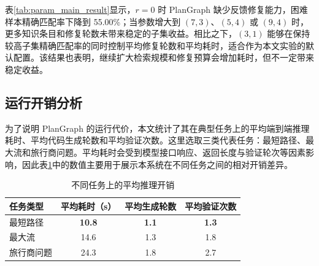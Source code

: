 \begin{table}[htbp]
\centering
\caption{不同参数组合下典型组合优化子集的性能比较（\%）}
\label{tab:param_main_result}
\small
{}
\end{table}

表\ref{tab:param_main_result}显示，$r=0$ 时 PlanGraph 缺少反馈修复能力，困难样本精确匹配率下降到 55.00\%；当参数增大到 $(7,3)$、$(5,4)$ 或 $(9,4)$ 时，更多知识条目和修复轮数未带来稳定的子集收益。相比之下，$(3,1)$ 能够在保持较高子集精确匹配率的同时控制平均修复轮数和平均耗时，适合作为本文实验的默认配置。该结果也表明，继续扩大检索规模和修复预算会增加耗时，但不一定带来稳定收益。

\subsection{运行开销分析}

为了说明 PlanGraph 的运行代价，本文统计了其在典型任务上的平均端到端推理耗时、平均代码生成轮数和平均验证次数。这里选取三类代表任务：最短路径、最大流和旅行商问题。平均耗时会受到模型接口响应、返回长度与验证轮次等因素影响，因此表\ref{tab:efficiency}中的数值主要用于展示本系统在不同任务之间的相对开销差异。

\begin{table}[htbp]
\centering
\caption{不同任务上的平均推理开销}
\label{tab:efficiency}
\begin{tabular}{lccc}
\toprule
任务类型 & 平均耗时（s） & 平均生成轮数 & 平均验证次数 \\
\midrule
最短路径 & \textbf{10.8} & \textbf{1.1} & \textbf{1.3} \\
最大流 & 14.6 & 1.3 & 1.8 \\
旅行商问题 & 24.3 & 1.8 & 2.7 \\
\bottomrule
\end{tabular}
\end{table}

